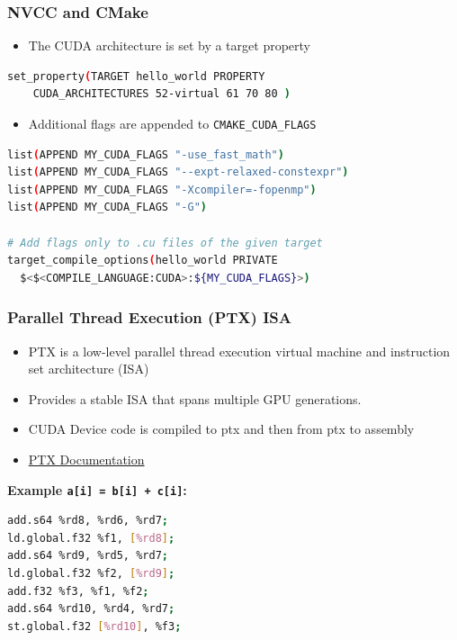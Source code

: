 \documentclass[aspectratio=169,handout]{beamer}
\begin{document}
\begin{frame}[fragile]
\frametitle{NVCC and CMake}
\begin{itemize}
	\item The CUDA architecture is set by a target property
\end{itemize}
\begin{lstlisting}[language=bash]
set_property(TARGET hello_world PROPERTY 
	CUDA_ARCHITECTURES 52-virtual 61 70 80 )
\end{lstlisting}
\begin{itemize}
	\item Additional flags are appended to \texttt{CMAKE\_CUDA\_FLAGS} 
\end{itemize}
\begin{lstlisting}[language=bash]
list(APPEND MY_CUDA_FLAGS "-use_fast_math")
list(APPEND MY_CUDA_FLAGS "--expt-relaxed-constexpr")
list(APPEND MY_CUDA_FLAGS "-Xcompiler=-fopenmp")
list(APPEND MY_CUDA_FLAGS "-G")

# Add flags only to .cu files of the given target
target_compile_options(hello_world PRIVATE
  $<$<COMPILE_LANGUAGE:CUDA>:${MY_CUDA_FLAGS}>)
\end{lstlisting}

\end{frame}



\begin{frame}[fragile]
\frametitle{Parallel Thread Execution (PTX) ISA}
\begin{itemize}
	\item PTX is a low-level parallel thread execution virtual machine and instruction set architecture (ISA)
	\item Provides a stable ISA that spans multiple GPU generations.
	\item CUDA Device code is compiled to ptx and then from ptx to assembly
	\item \href{https://docs.nvidia.com/cuda/parallel-thread-execution/index.html}{PTX Documentation}
\end{itemize}
\textbf{Example \texttt{a[i] = b[i] + c[i]}:}
\begin{lstlisting}[language=bash]
add.s64 %rd8, %rd6, %rd7;
ld.global.f32 %f1, [%rd8];
add.s64 %rd9, %rd5, %rd7;
ld.global.f32 %f2, [%rd9];
add.f32 %f3, %f1, %f2;
add.s64 %rd10, %rd4, %rd7;
st.global.f32 [%rd10], %f3;
\end{lstlisting}
\end{frame}
\end{document}
